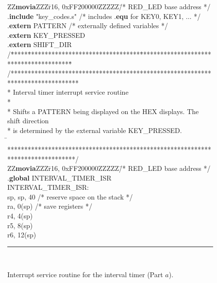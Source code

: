 \begin{figure}[h!]
\begin{center}
\begin{minipage}[t]{12.5 cm}
\begin{tabbing}
ZZ\={\bf movia}ZZZ\=r16, 0xFF200000ZZZZZ\=/* RED\_LED base address */\kill
.{\bf include} \>\>"key\_codes.s" \>/* includes .{\bf equ} for KEY0, KEY1, $\ldots$ */\\
.{\bf extern} \>\>PATTERN \>/* externally defined variables */\\
.{\bf extern} \>\>KEY\_PRESSED\\
.{\bf extern} \>\>SHIFT\_DIR\\
/\=*****\=*********************************\=****************************************\=\kill
/********************************************************************************\\
\>* Interval timer interrupt service routine\\
\>*                                                                          \\
\>* Shifts a PATTERN being displayed on the HEX displays. The shift direction \\
\>* is determined by the external variable KEY\_PRESSED.\\
\=\kill
\>********************************************************************************/\\
ZZ\={\bf movia}ZZZ\=r16, 0xFF200000ZZZZZ\=/* RED\_LED base address */\kill
\>.{\bf global} \>INTERVAL\_TIMER\_ISR\\
INTERVAL\_TIMER\_ISR:					\\
 \>sp,  sp, 40 \>/* reserve space on the stack */\\
 \>ra, 0(sp) \>/* save registers */\\
	\>r4, 4(sp)\\
	\>r5, 8(sp)\\
	\>r6, 12(sp)\\
\rule{6.0in}{0in}~\\
\end{tabbing}
\end{minipage}
\end{center}
	\vspace{-0.33in}\caption{Interrupt service routine for the interval timer (Part $a$).}
   \label{fig:interval_timer_isr_s}
\end{figure}
\pagebreak
\clearpage

